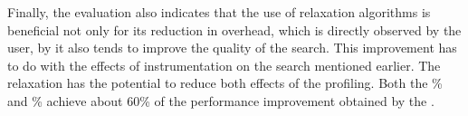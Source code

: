 Finally, the evaluation also indicates that the use of relaxation algorithms
is beneficial not only for its reduction in overhead, which is directly observed
by the user, by it also tends to improve the quality of the search.
This improvement has to do with the effects of 
instrumentation on the search mentioned earlier.
The relaxation has the potential to reduce both effects of the profiling.
Both the \% and \% achieve about 60\% of the
performance improvement obtained by the \OracleRM.
